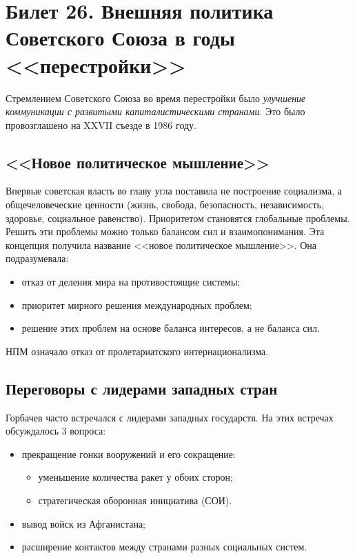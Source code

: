 \section{Билет 26. Внешняя политика Советского Союза в годы <<перестройки>>}

Стремлением Советского Союза во время перестройки было \textit{улучшение коммуникации с развитыми капиталистическими странами}. Это было провозглашено на XXVII съезде в 1986 году. 

\subsection{<<Новое политическое мышление>>}
Впервые советская власть во главу угла поставила не построение социализма, а общечеловеческие ценности (жизнь, свобода, безопасность, независимость, здоровье, социальное равенство). Приоритетом становятся глобальные проблемы. Решить эти проблемы можно только балансом сил и взаимопонимания. Эта концепция получила название <<новое политическое мышление>>. Она подразумевала:
\begin{itemize}
    \item отказ от деления мира на противостоящие системы;
    \item приоритет мирного решения международных проблем;
    \item решение этих проблем на основе баланса интересов, а не баланса сил.
\end{itemize} \vspace{0.5cm}

НПМ означало отказ от пролетариатского интернационализма. 

\subsection{Переговоры с лидерами западных стран}
Горбачев часто встречался с лидерами западных государств. На этих встречах обсуждалось 3 вопроса: 
\begin{itemize}
    \item прекращение гонки вооружений и его сокращение: 
        \begin{itemize}
            \item уменьшение количества ракет у обоих сторон;
            \item стратегическая оборонная инициатива (СОИ).
        \end{itemize} 
    \item вывод войск из Афганистана;
    \item расширение контактов между странами разных социальных систем.
\end{itemize} \vspace{0.5cm}

